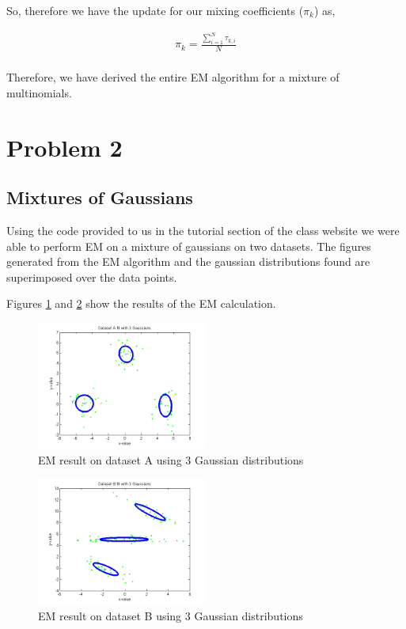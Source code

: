 \documentclass[paper=a4, fontsize=11pt]{scrartcl} %
\begin{document}
So, therefore we have the update for our mixing coefficients ($\pi_k$) as,

\begin{align}
\pi_k = \frac{\sum_{i=1}^N \tau_{k,i}}{N} \\
\end{align}

Therefore, we have derived the entire EM algorithm for a mixture of multinomials.


\section{Problem 2}

\subsection{Mixtures of Gaussians}
Using the code provided to us in the tutorial section of the class website we were able to perform EM on a mixture of gaussians on two datasets.
The figures generated from the EM algorithm and the gaussian distributions found are superimposed over the data points.

Figures \ref{fig:datasetA} and \ref{fig:datasetB} show the results of the EM calculation.

\begin{figure}
\centering
\includegraphics[width=0.5\textwidth]{datasetA.png}
\caption{EM result on dataset A using 3 Gaussian distributions}
\label{fig:datasetA}
\end{figure}

\begin{figure}
\centering
\includegraphics[width=0.5\textwidth]{datasetB.png}
\caption{EM result on dataset B using 3 Gaussian distributions}
\label{fig:datasetB}
\end{figure}
\end{document}
